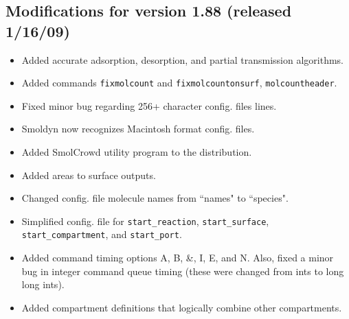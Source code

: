 \documentclass {scrbook}
\newcommand {\ttt} {\texttt}
\begin{document}
\subsection{Modifications for version 1.88 (released 1/16/09)}
\begin{itemize}
\item Added accurate adsorption, desorption, and partial transmission algorithms.
\item Added commands \ttt{fixmolcount} and \ttt{fixmolcountonsurf}, \ttt{molcountheader}.
\item Fixed minor bug regarding 256+ character config. files lines.
\item Smoldyn now recognizes Macintosh format config. files.
\item Added SmolCrowd utility program to the distribution.
\item Added areas to surface outputs.
\item Changed config. file molecule names from ``names" to ``species".
\item Simplified config. file for \ttt{start\_reaction}, \ttt{start\_surface}, \ttt{start\_compartment}, and \ttt{start\_port}.
\item Added command timing options A, B, \&, I, E, and N. Also, fixed a minor bug in integer command queue timing (these were changed from ints to long long ints).
\item Added compartment definitions that logically combine other compartments.
\end{itemize}
\end{document}
